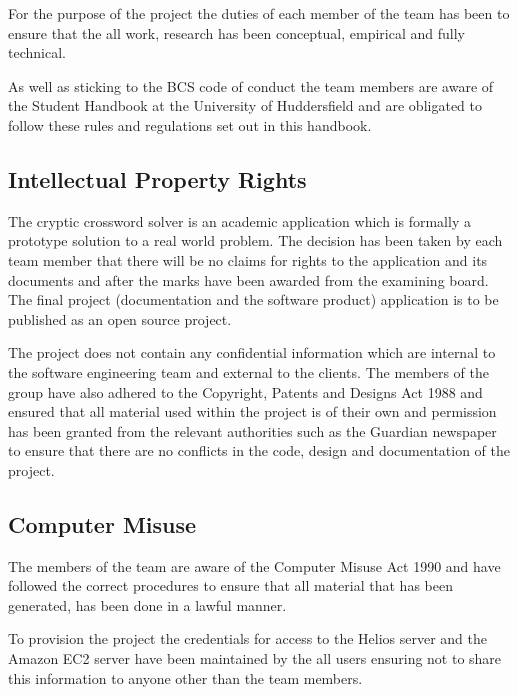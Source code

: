 \begin{flushright}
  {\footnotesize \citet{bcs14}}
\end{flushright}

For the purpose of the project the duties of each member of the team has been to
ensure that the all work, research has been conceptual, empirical and fully
technical.

As well as sticking to the BCS code of conduct the team members are aware of the
Student Handbook at the University of Huddersfield and are obligated to follow
these rules and regulations set out in this handbook.


\subsection{Intellectual Property Rights}

The cryptic crossword solver is an academic application which is formally a
prototype solution to a real world problem. The decision has been taken by each
team member that there will be no claims for rights to the application and its
documents and after the marks have been awarded from the examining board. The
final project (documentation and the software product) application is to be
published as an open source project.

The project does not contain any confidential information which are internal to
the software engineering team and external to the clients. The members of the
group have also adhered to the Copyright, Patents and Designs Act 1988 and
ensured that all material used within the project is of their own and permission
has been granted from the relevant authorities such as the Guardian newspaper to
ensure that there are no conflicts in the code, design and documentation of the
project.


\subsection{Computer Misuse}

The members of the team are aware of the Computer Misuse Act 1990 and have
followed the correct procedures to ensure that all material that has been
generated, has been done in a lawful manner.

To provision the project the credentials for access to the Helios server and the
Amazon EC2 server have been maintained by the all users ensuring not to share
this information to anyone other than the team members.


